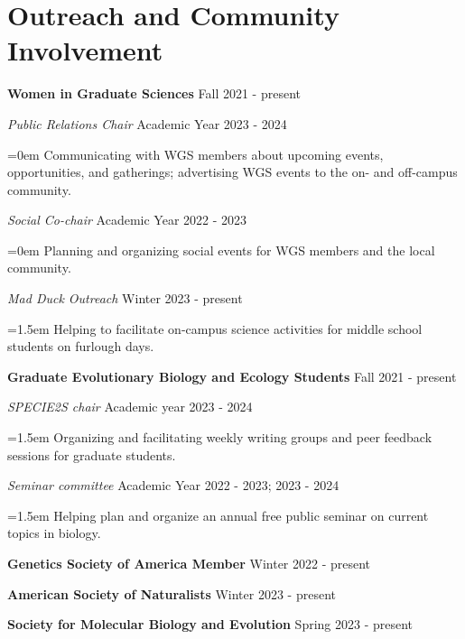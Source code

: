 \documentclass[11pt]{extarticle}
\newcommand{\NewPart}[1]{\section*{{#1}}}
\begin{document}
\NewPart{Outreach and Community Involvement}

\noindent \textbf{Women in Graduate Sciences}  \hfill Fall 2021 - present \par
\vspace{1mm}
\textit{Public Relations Chair} \hfill Academic Year 2023 - 2024 \par
{\narrower \hangindent=0em {Communicating with WGS members about upcoming events, opportunities, and gatherings; 
                                        advertising WGS events to the on- and off-campus community.} \normalsize \par }
\vspace{1mm}
\textit{Social Co-chair} \hfill Academic Year 2022 - 2023 \par
{\narrower \hangindent=0em {Planning and organizing social events for WGS members and the local community.} \normalsize \par }
\vspace{1mm}
\textit{Mad Duck Outreach} \hfill Winter 2023 - present \par
{\narrower \hangindent=1.5em {Helping to facilitate on-campus science activities for middle school students on furlough days.} \normalsize \par }
\vspace{2.5mm}
\noindent \textbf{Graduate Evolutionary Biology and Ecology Students} \hfill Fall 2021 - present \par
\vspace{1mm}
\textit{SPECIE2S chair} \hfill Academic year 2023 - 2024 \par
{\narrower \hangindent=1.5em {Organizing and facilitating weekly writing groups and peer feedback sessions for graduate students.} \normalsize \par }
\vspace{2.5mm}
\vspace{1mm}
\textit{Seminar committee} \hfill Academic Year 2022 - 2023; 2023 - 2024 \par
{\narrower \hangindent=1.5em {Helping plan and organize an annual free public seminar on current topics in biology.} \normalsize \par }
\vspace{2.5mm}
\noindent \textbf{Genetics Society of America Member} \hfill Winter 2022 - present \par
\vspace{2.5mm}
\noindent \textbf{American Society of Naturalists} \hfill Winter 2023 - present \par
\vspace{2.5mm}
\noindent \textbf{Society for Molecular Biology and Evolution} \hfill Spring 2023 - present \par
\end{document}
